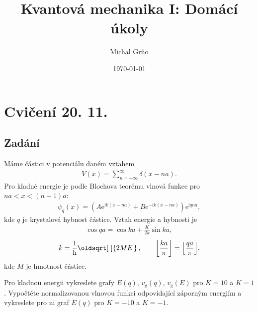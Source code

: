 \documentclass[10pt,a4paper]{article}
\renewcommand*{\sqrt}[2][\ ]{\oldsqrt[#1]{#2\,}\,}
\DeclarePairedDelimiter\floor{\lfloor}{\rfloor}
\newcommand{\const}[1]{\text{#1}}
\newcommand{\e}[1]{\const{e}^{#1}}
\renewcommand{\i}{\const{i}}
\begin{document}
\title{Kvantová mechanika I: Domácí úkoly}
\author{Michal Grňo}
\date{\today}

\maketitle

\section{Cvičení 20. 11.}

\subsection{Zadání}
Máme částici v potenciálu daném vztahem
\begin{gather*}
    V(x) = \sum_{n=-\infty}^\infty \delta(x-na).
\end{gather*}
Pro kladné energie je podle Blochova teorému vlnová funkce pro $na < x < (n+1)a$:
\begin{gather*}
    \psi_q(x) = \left( A \e{\i k (x-na)} + B \e{-\i k (x-na)} \right)\e{\i q n a},
\end{gather*}
kde $q$ je krystalová hybnost částice. Vztah energie a hybnosti je
\begin{gather}
    \cos qa = \cos ka + \frac{K}{2k} \sin ka,
    \label{implicitni-qE}
\end{gather}
\begin{gather*}
    k = \frac{1}{\hbar} \sqrt{2ME},
    \hspace{2em}
    \floor*{\frac{ka}{\pi}} = \floor*{\frac{qa}{\pi}},
\end{gather*}
kde $M$ je hmotnost částice.

Pro kladnou energii vykreslete grafy $E(q)$, $v_\const{g}(q)$, $v_\const{g}(E)$ pro $K=10$ a $K=1$. Vypočtěte normalizovanou vlnovou funkci odpovídající záporným energiím a vykreslete pro ni graf $E(q)$ pro $K=-10$ a $K=-1$.
\end{document}
